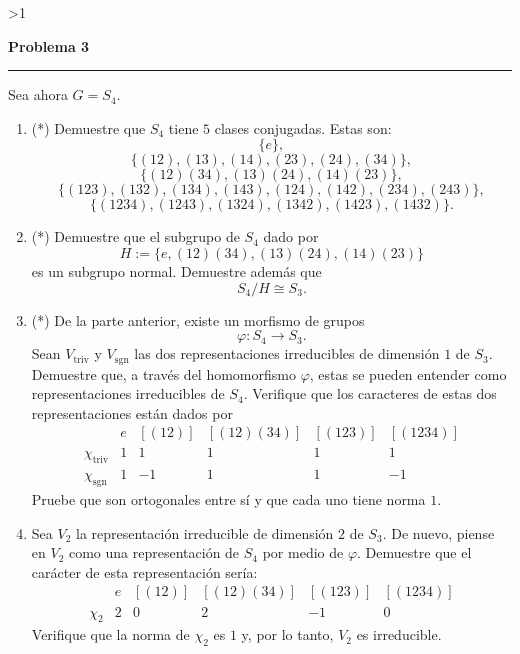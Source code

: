 \documentclass[10pt,a4paper]{article}
\newcounter{probcnt}
\newcommand{\problem}[2]{%
  \stepcounter{probcnt}%
  \ifnum\value{probcnt}>1\newpage\fi
  \par\vspace{0.25em}
  {\large\bfseries\color{repblue} Problema #1}\par
  {\color{repline}\rule{\linewidth}{0.55pt}}\par
  \begin{tcolorbox}[
    breakable,
    colback=white,
    colframe=repline,
    borderline west={1.6pt}{0pt}{repteal},
    left=0.7em,
    right=0.7em,
    top=0.35em,
    bottom=0.3em,
    before skip=0.35em,
    after skip=0.45em
  ]
    #2
  \end{tcolorbox}
}
\begin{document}
\problem{3}{%
Sea ahora $G = S_4$.

\begin{enumerate}[label=(\alph*),leftmargin=2.4em]
\item (*) Demuestre que $S_4$ tiene $5$ clases conjugadas. Estas son:
\[
  \{e\},
\]
\[
  \{(12), (13), (14), (23), (24), (34)\},
\]
\[
  \{(12)(34), (13)(24), (14)(23)\},
\]
\[
  \{(123), (132), (134), (143), (124), (142), (234), (243)\},
\]
\[
  \{(1234), (1243), (1324), (1342), (1423), (1432)\}.
\]

\item (*) Demuestre que el subgrupo de $S_4$ dado por
\[
  H := \{e, (12)(34), (13)(24), (14)(23)\}
\]
es un subgrupo normal. Demuestre además que
\[
  S_4/H \cong S_3.
\]

\item (*) De la parte anterior, existe un morfismo de grupos
\[
  \varphi : S_4 \to S_3.
\]
Sean $V_{\mathrm{triv}}$ y $V_{\mathrm{sgn}}$ las dos representaciones irreducibles de dimensión
$1$ de $S_3$. Demuestre que, a través del homomorfismo $\varphi$, estas se pueden entender
como representaciones irreducibles de $S_4$. Verifique que los caracteres de estas dos
representaciones están dados por
\[
  \begin{array}{c|ccccc}
    & e & [(12)] & [(12)(34)] & [(123)] & [(1234)] \\
    \chi_{\mathrm{triv}} & 1 & 1 & 1 & 1 & 1 \\
    \chi_{\mathrm{sgn}} & 1 & -1 & 1 & 1 & -1
  \end{array}
\]
Pruebe que son ortogonales entre sí y que cada uno tiene norma $1$.

\item Sea $V_2$ la representación irreducible de dimensión $2$ de $S_3$. De nuevo, piense en
$V_2$ como una representación de $S_4$ por medio de $\varphi$. Demuestre que el carácter de
esta representación sería:
\[
  \begin{array}{c|ccccc}
    & e & [(12)] & [(12)(34)] & [(123)] & [(1234)] \\
    \chi_2 & 2 & 0 & 2 & -1 & 0
  \end{array}
\]
Verifique que la norma de $\chi_2$ es $1$ y, por lo tanto, $V_2$ es irreducible.


\end{enumerate}}
\end{document}
